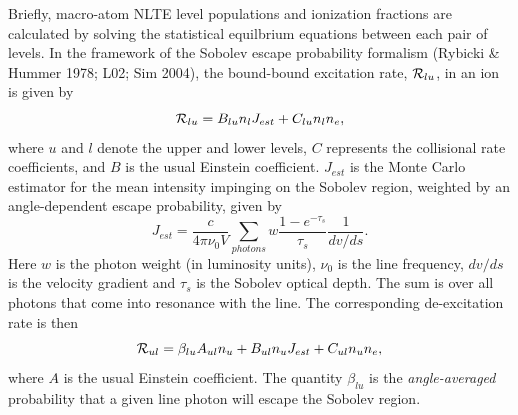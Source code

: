 \documentclass[preprint, a4paper, 11pt]{aastex}
\begin{document}
Briefly, macro-atom NLTE level populations and ionization fractions
are calculated by solving the statistical equilbrium equations between
each pair of levels. In the framework of the Sobolev escape probability formalism (Rybicki \& Hummer 1978; L02; Sim 2004), 
the bound-bound excitation rate, ${\cal R}_{lu}$, in an ion is given by 
\begin{equation}
{\cal R}_{lu} = B_{lu} n_l J_{est} + C_{lu} n_l n_e,
\end{equation}
where $u$ and $l$ denote the upper and lower levels, $C$ represents the
collisional rate coefficients, and $B$ is the usual Einstein
coefficient. $J_{est}$ is the Monte Carlo estimator for the mean intensity 
impinging on the Sobolev region, weighted by an angle-dependent escape probability, 
given by \citep{sim2004}
\begin{equation}
J_{est} = \frac{c}{4 \pi \nu_0 V} \sum_{photons} w \frac{1 - e^{-\tau_s}}{\tau_s} \frac{1}{dv/ds}.
\end{equation}
Here $w$ is the photon weight (in luminosity units), $\nu_0$
is the line frequency, $dv/ds$ is the velocity gradient and
$\tau_s$ is the Sobolev optical depth.
The sum is over all photons that come into resonance with the line.
The corresponding de-excitation rate is then 
\begin{equation}
{\cal R}_{ul} = \beta_{lu} A_{ul} n_u + B_{ul} n_u J_{est} +
C_{ul} n_u n_e,
\label{eq:nlte_rul}
\end{equation}
where $A$ is the usual Einstein coefficient. 
The quantity $\beta_{lu}$ is the {\em angle-averaged} probability 
that a given line photon will escape the Sobolev region.
\end{document}
